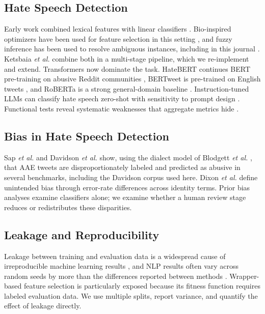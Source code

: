 \documentclass[lettersize,journal]{IEEEtran}
\begin{document}
\subsection{Hate Speech Detection}
Early work combined lexical features with linear classifiers \cite{davidson2017automated,fortuna2018survey}. Bio-inspired optimizers have been used for feature selection in this setting \cite{baydogan2021metaheuristic}, and fuzzy inference has been used to resolve ambiguous instances, including in this journal \cite{liu2019fuzzy}. Ketsbaia \textit{et al.} \cite{ketsbaia2023multistage} combine both in a multi-stage pipeline, which we re-implement and extend. Transformers now dominate the task. HateBERT continues BERT pre-training on abusive Reddit communities \cite{caselli2021hatebert}, BERTweet is pre-trained on English tweets \cite{nguyen2020bertweet}, and RoBERTa is a strong general-domain baseline \cite{liu2019roberta}. Instruction-tuned LLMs can classify hate speech zero-shot with sensitivity to prompt design \cite{plazadelarco2023respectful}. Functional tests reveal systematic weaknesses that aggregate metrics hide \cite{rottger2021hatecheck}.

\subsection{Bias in Hate Speech Detection}
Sap \textit{et al.} \cite{sap2019risk} and Davidson \textit{et al.} \cite{davidson2019racial} show, using the dialect model of Blodgett \textit{et al.} \cite{blodgett2016demographic}, that AAE tweets are disproportionately labeled and predicted as abusive in several benchmarks, including the Davidson corpus used here. Dixon \textit{et al.} \cite{dixon2018measuring} define unintended bias through error-rate differences across identity terms. Prior bias analyses examine classifiers alone; we examine whether a human review stage reduces or redistributes these disparities.

\subsection{Leakage and Reproducibility}
Leakage between training and evaluation data is a widespread cause of irreproducible machine learning results \cite{kapoor2023leakage}, and NLP results often vary across random seeds by more than the differences reported between methods \cite{dodge2019show}. Wrapper-based feature selection is particularly exposed because its fitness function requires labeled evaluation data. We use multiple splits, report variance, and quantify the effect of leakage directly.
\end{document}
